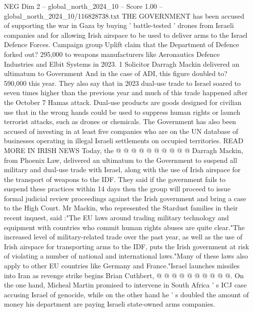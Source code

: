 \begin{textsample}{NEG Dim 2 – global\_north\_2024\_10 – Score 1.00 – global\_north\_2024\_10/116828738.txt}  \label{ex:f2_neg_106}
THE GOVERNMENT has been accused of supporting the war in Gaza by buying ' battle-tested ' drones from Israeli companies and for allowing Irish airspace to be used to deliver arms to the Israel Defence Forces.
Campaign group Uplift claim that the Department of Defence forked out? 295,000 to weapons manufacturers like Aeronautics Defence Industries and Elbit Systems in 2023. 1 Solicitor Darragh Mackin delivered an ultimatum to Government And in the case of ADI, this figure doubled to? 590,000 this year.
They also say that in 2023 dual-use trade to Israel soared to seven times higher than the previous year and much of this trade happened after the October 7 Hamas attack.
Dual-use products are goods designed for civilian use that in the wrong hands could be used to suppress human rights or launch terrorist attacks, such as drones or chemicals.
The Government has also been accused of investing in at least five companies who are on the UN database of businesses operating in illegal Israeli settlements on occupied territories.
READ MORE IN IRISH NEWS Today, the @ @ @ @ @ @ @ @ @ @ Darragh Mackin, from Phoenix Law, delivered an ultimatum to the Government to suspend all military and dual-use trade with Israel, along with the use of Irish airspace for the transport of weapons to the IDF.
They said if the government fails to suspend these practices within 14 days then the group will proceed to issue formal judicial review proceedings against the Irish government and bring a case to the High Court.
Mr Mackin, who represented the Stardust families in their recent inquest, said :"The EU laws around trading military technology and equipment with countries who commit human rights abuses are quite clear."The increased level of military-related trade over the past year, as well as the use of Irish airspace for transporting arms to the IDF, puts the Irish government at risk of violating a number of national and international laws."Many of these laws also apply to other EU countries like Germany and France."Israel launches missiles into Iran as revenge strike begins Brian Cuthbert, @ @ @ @ @ @ @ @ @ @.
On the one hand, Micheal Martin promised to intervene in South Africa ' s ICJ case accusing Israel of genocide, while on the other hand he ' s doubled the amount of money his department are paying Israeli state-owned arms companies.

\end{textsample}
